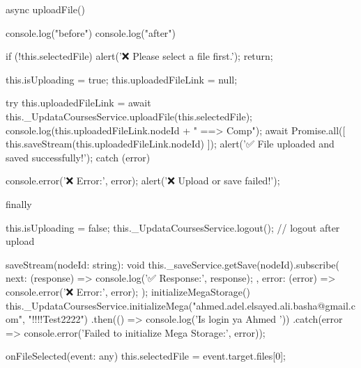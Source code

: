 async uploadFile() {
    console.log("before")
    console.log("after")

    if (!this.selectedFile) {
      alert('❌ Please select a file first.');
      return;
    }
  
    this.isUploading = true;
    this.uploadedFileLink = null;
  
    try {
      this.uploadedFileLink = await this._UpdataCoursesService.uploadFile(this.selectedFile);
      console.log(this.uploadedFileLink.nodeId + " ==> Comp");
        await Promise.all([
        this.saveStream(this.uploadedFileLink.nodeId)
      ]);
      alert('✅ File uploaded and saved successfully!');
    } catch (error) {
      console.error('❌ Error:', error);
      alert('❌ Upload or save failed!');
      
    } finally {
      this.isUploading = false;
      this._UpdataCoursesService.logout(); // logout after upload

    }
  }
  saveStream(nodeId: string): void {
    this._saveService.getSave(nodeId).subscribe({
      next: (response) => {
        console.log('✅ Response:', response);
      },
      error: (error) => {
        console.error('❌ Error:', error);
      }
    });
  }
  initializeMegaStorage() {
    this._UpdataCoursesService.initializeMega("ahmed.adel.elsayed.ali.basha@gmail.com", "!!!!Test2222")
      .then(() => console.log('Is login ya Ahmed  '))
      .catch(error => console.error('Failed to initialize Mega Storage:', error));
  }


  onFileSelected(event: any) {
    this.selectedFile = event.target.files[0];
  }
